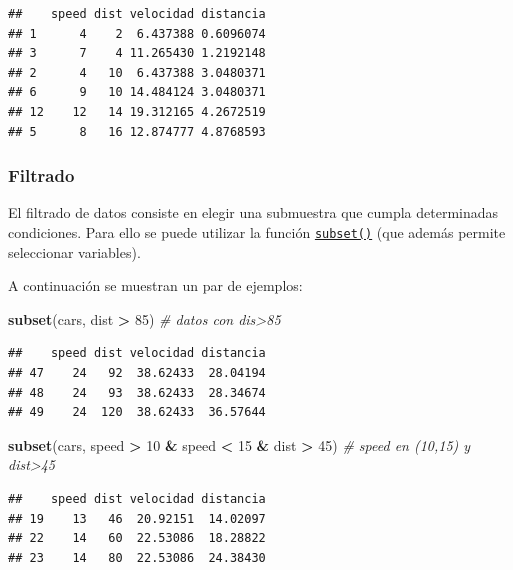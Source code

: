 \documentclass[]{book}
\newenvironment{Shaded}{\begin{snugshade}}{\end{snugshade}}
\newcommand{\KeywordTok}[1]{\textcolor[rgb]{0.13,0.29,0.53}{\textbf{#1}}}
\newcommand{\DecValTok}[1]{\textcolor[rgb]{0.00,0.00,0.81}{#1}}
\newcommand{\StringTok}[1]{\textcolor[rgb]{0.31,0.60,0.02}{#1}}
\newcommand{\CommentTok}[1]{\textcolor[rgb]{0.56,0.35,0.01}{\textit{#1}}}
\newcommand{\OperatorTok}[1]{\textcolor[rgb]{0.81,0.36,0.00}{\textbf{#1}}}
\newcommand{\NormalTok}[1]{#1}
\begin{document}
\begin{verbatim}
##    speed dist velocidad distancia
## 1      4    2  6.437388 0.6096074
## 3      7    4 11.265430 1.2192148
## 2      4   10  6.437388 3.0480371
## 6      9   10 14.484124 3.0480371
## 12    12   14 19.312165 4.2672519
## 5      8   16 12.874777 4.8768593
\end{verbatim}

\subsubsection{Filtrado}\label{filtrado}

El filtrado de datos consiste en elegir una submuestra que cumpla
determinadas condiciones. Para ello se puede utilizar la función
\href{https://www.rdocumentation.org/packages/base/versions/3.6.1/topics/subset}{\texttt{subset()}}
(que además permite seleccionar variables).

A continuación se muestran un par de ejemplos:

\begin{Shaded}
\begin{Highlighting}[]
\KeywordTok{subset}\NormalTok{(cars, dist }\OperatorTok{>}\StringTok{ }\DecValTok{85}\NormalTok{) }\CommentTok{# datos con dis>85}
\end{Highlighting}
\end{Shaded}

\begin{verbatim}
##    speed dist velocidad distancia
## 47    24   92  38.62433  28.04194
## 48    24   93  38.62433  28.34674
## 49    24  120  38.62433  36.57644
\end{verbatim}

\begin{Shaded}
\begin{Highlighting}[]
\KeywordTok{subset}\NormalTok{(cars, speed }\OperatorTok{>}\StringTok{ }\DecValTok{10} \OperatorTok{&}\StringTok{ }\NormalTok{speed }\OperatorTok{<}\StringTok{ }\DecValTok{15} \OperatorTok{&}\StringTok{ }\NormalTok{dist }\OperatorTok{>}\StringTok{ }\DecValTok{45}\NormalTok{) }\CommentTok{# speed en (10,15) y dist>45}
\end{Highlighting}
\end{Shaded}

\begin{verbatim}
##    speed dist velocidad distancia
## 19    13   46  20.92151  14.02097
## 22    14   60  22.53086  18.28822
## 23    14   80  22.53086  24.38430
\end{verbatim}
\end{document}
